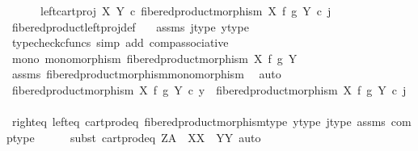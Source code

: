 \begin{isabellebody}
\ \ \ \ \ \ left{\isacharunderscore}{\kern0pt}cart{\isacharunderscore}{\kern0pt}proj\ X\ Y\ {\isasymcirc}\isactrlsub c\ {\isacharparenleft}{\kern0pt}fibered{\isacharunderscore}{\kern0pt}product{\isacharunderscore}{\kern0pt}morphism\ X\ f\ g\ Y\ {\isasymcirc}\isactrlsub c\ j{\isacharparenright}{\kern0pt}{\isachardoublequoteclose}\isanewline
\ \ \ \ \isamarkupfalse%
\ fibered{\isacharunderscore}{\kern0pt}product{\isacharunderscore}{\kern0pt}left{\isacharunderscore}{\kern0pt}proj{\isacharunderscore}{\kern0pt}def\ \ \isamarkupfalse%
\ assms\ j{\isacharunderscore}{\kern0pt}type\ y{\isacharunderscore}{\kern0pt}type\isanewline
\ \ \ \ \isamarkupfalse%
\ {\isacharparenleft}{\kern0pt}typecheck{\isacharunderscore}{\kern0pt}cfuncs{\isacharcomma}{\kern0pt}\ simp\ add{\isacharcolon}{\kern0pt}\ comp{\isacharunderscore}{\kern0pt}associative{}{\isacharparenright}{\kern0pt}\isanewline
\isanewline
\ \ \isamarkupfalse%
\ mono{\isacharcolon}{\kern0pt}\ {\isachardoublequoteopen}monomorphism\ {\isacharparenleft}{\kern0pt}fibered{\isacharunderscore}{\kern0pt}product{\isacharunderscore}{\kern0pt}morphism\ X\ f\ g\ Y{\isacharparenright}{\kern0pt}{\isachardoublequoteclose}\isanewline
\ \ \ \ \isamarkupfalse%
\ assms\ fibered{\isacharunderscore}{\kern0pt}product{\isacharunderscore}{\kern0pt}morphism{\isacharunderscore}{\kern0pt}monomorphism\ \isamarkupfalse%
\ auto\isanewline
\isanewline
\ \ \isamarkupfalse%
\ {\isachardoublequoteopen}fibered{\isacharunderscore}{\kern0pt}product{\isacharunderscore}{\kern0pt}morphism\ X\ f\ g\ Y\ {\isasymcirc}\isactrlsub c\ y\ {\isacharequal}{\kern0pt}\ fibered{\isacharunderscore}{\kern0pt}product{\isacharunderscore}{\kern0pt}morphism\ X\ f\ g\ Y\ {\isasymcirc}\isactrlsub c\ j{\isachardoublequoteclose}\isanewline
\ \ \ \ \isamarkupfalse%
\ right{\isacharunderscore}{\kern0pt}eq\ left{\isacharunderscore}{\kern0pt}eq\ cart{\isacharunderscore}{\kern0pt}prod{\isacharunderscore}{\kern0pt}eq\ fibered{\isacharunderscore}{\kern0pt}product{\isacharunderscore}{\kern0pt}morphism{\isacharunderscore}{\kern0pt}type\ y{\isacharunderscore}{\kern0pt}type\ j{\isacharunderscore}{\kern0pt}type\ assms\ comp{\isacharunderscore}{\kern0pt}type\isanewline
\ \ \ \ \isamarkupfalse%
\ {\isacharparenleft}{\kern0pt}subst\ cart{\isacharunderscore}{\kern0pt}prod{\isacharunderscore}{\kern0pt}eq{\isacharbrackleft}{\kern0pt}\ Z{\isacharequal}{\kern0pt}A{\isacharcomma}{\kern0pt}\ \ X{\isacharequal}{\kern0pt}X{\isacharcomma}{\kern0pt}\ \ Y{\isacharequal}{\kern0pt}Y{\isacharbrackright}{\kern0pt}{\isacharcomma}{\kern0pt}\ auto{\isacharparenright}{\kern0pt}\isanewline

\end{isabellebody}
